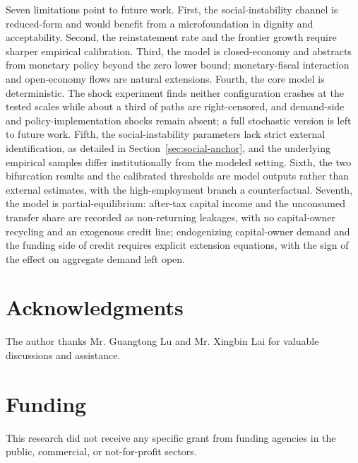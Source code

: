 \documentclass[review,12pt]{elsarticle}
\theoremstyle{plain}
\theoremstyle{definition}
\theoremstyle{remark}
\begin{document}
Seven limitations point to future work. First, the social-instability channel is reduced-form and would benefit from a microfoundation in dignity and acceptability. Second, the reinstatement rate and the frontier growth require sharper empirical calibration. Third, the model is closed-economy and abstracts from monetary policy beyond the zero lower bound; monetary-fiscal interaction and open-economy flows are natural extensions. Fourth, the core model is deterministic. The shock experiment finds neither configuration crashes at the tested scales while about a third of paths are right-censored, and demand-side and policy-implementation shocks remain absent; a full stochastic version is left to future work. Fifth, the social-instability parameters lack strict external identification, as detailed in Section~\ref{sec:social-anchor}, and the underlying empirical samples differ institutionally from the modeled setting. Sixth, the two bifurcation results and the calibrated thresholds are model outputs rather than external estimates, with the high-employment branch a counterfactual. Seventh, the model is partial-equilibrium: after-tax capital income and the unconsumed transfer share are recorded as non-returning leakages, with no capital-owner recycling and an exogenous credit line; endogenizing capital-owner demand and the funding side of credit requires explicit extension equations, with the sign of the effect on aggregate demand left open.

\section*{Acknowledgments}

The author thanks Mr. Guangtong Lu and Mr. Xingbin Lai for valuable discussions and assistance.

\section*{Funding}

This research did not receive any specific grant from funding agencies in the public, commercial, or not-for-profit sectors.

\end{document}
